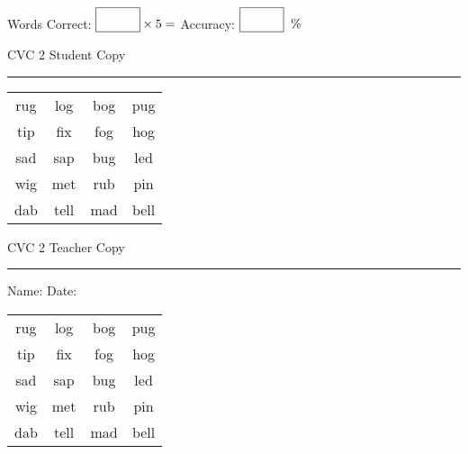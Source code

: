 \documentclass{memoir}
\begin{document}
\small

Words Correct: $\fbox{\phantom{\huge 100}} \times 5 = $ Accuracy: $\fbox{\phantom{\huge 100}}\;\; \%$ 

\vfill

\newpage


\footnotesize \noindent
CVC 2 \hfill Student Copy
\smallskip
\hrule

\Large

\setlength{\tabcolsep}{14pt}
\def\arraystretch{2}

{\selectfont


\begin{vplace}[0.5]
\begin{center}
\begin{tabular}{cccc}
rug & log & bog & pug \\
tip & fix & fog & hog \\
sad & sap & bug & led \\
wig & met & rub & pin \\
dab & tell & mad & bell \\
\end{tabular}
\end{center}
\end{vplace}

}

\newpage

\footnotesize \noindent
CVC 2 \hfill Teacher Copy
\smallskip
\hrule

\small

\vfill

\noindent
Name: \underline{\hspace{1.75in}} \hfill Date: \underline{\hspace{1in}}

\Large

{\selectfont


\begin{vplace}[0.5]
\begin{center}
\begin{tabular}{cccc}
rug & log & bog & pug \\
tip & fix & fog & hog \\
sad & sap & bug & led \\
wig & met & rub & pin \\
dab & tell & mad & bell \\
\end{tabular}
\end{center}
\end{vplace}



}
\end{document}
